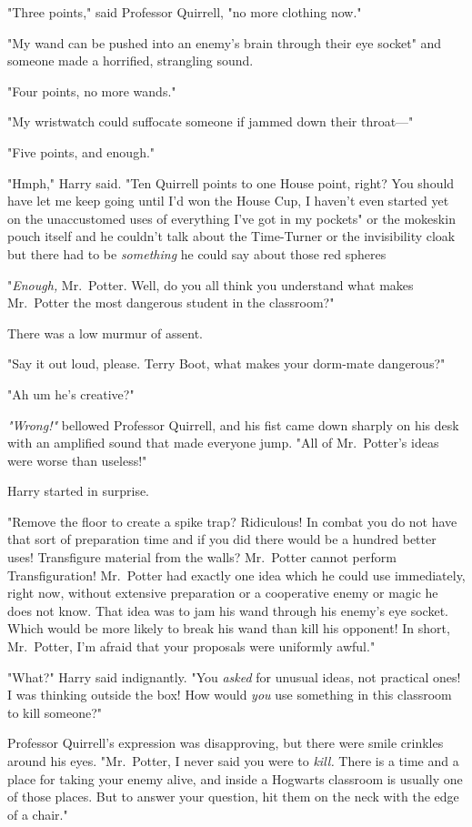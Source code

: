 "Three points," said Professor Quirrell, "no more clothing now."

"My wand can be pushed into an enemy's brain through their eye socket" and
someone made a horrified, strangling sound.

"Four points, no more wands."

"My wristwatch could suffocate someone if jammed down their throat\mbox{---}"

"Five points, and enough."

"Hmph," Harry said. "Ten Quirrell points to one House point, right? You should
have let me keep going until I'd won the House Cup, I haven't even started yet
on the unaccustomed uses of everything I've got in my pockets" or the mokeskin
pouch itself and he couldn't talk about the Time-Turner or the invisibility
cloak but there had to be \emph{something} he could say about those red
spheres{\el}

"\emph{Enough,} Mr.~Potter. Well, do you all think you understand what makes
Mr.~Potter the most dangerous student in the classroom?"

There was a low murmur of assent.

"Say it out loud, please. Terry Boot, what makes your dorm-mate dangerous?"

"Ah{\el} um{\el} he's creative?"

\emph{"Wrong!"} bellowed Professor Quirrell, and his fist came down sharply on
his desk with an amplified sound that made everyone jump. "All of Mr.~Potter's
ideas were worse than useless!"

Harry started in surprise.

"Remove the floor to create a spike trap? Ridiculous! In combat you do not have
that sort of preparation time and if you did there would be a hundred better
uses! Transfigure material from the walls? Mr.~Potter cannot perform
Transfiguration! Mr.~Potter had exactly one idea which he could use
immediately, right now, without extensive preparation or a cooperative enemy or
magic he does not know. That idea was to jam his wand through his enemy's eye
socket. Which would be more likely to break his wand than kill his opponent! In
short, Mr.~Potter, I'm afraid that your proposals were uniformly awful."

"What?" Harry said indignantly. "You \emph{asked} for unusual ideas, not
practical ones! I was thinking outside the box! How would \emph{you} use
something in this classroom to kill someone?"

Professor Quirrell's expression was disapproving, but there were smile crinkles
around his eyes. "Mr.~Potter, I never said you were to \emph{kill.} There is a
time and a place for taking your enemy alive, and inside a Hogwarts classroom
is usually one of those places. But to answer your question, hit them on the
neck with the edge of a chair."

